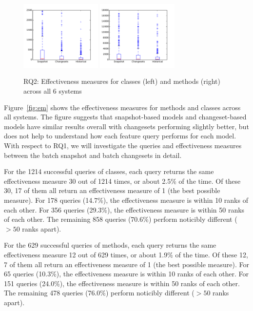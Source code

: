 \begin{figure}[t]
\centering
\includegraphics[width=0.36\textwidth]{figures/rq2-overall-class}
\includegraphics[width=0.36\textwidth]{figures/rq2-overall-method}
\caption{RQ2: Effectiveness measures for classes (left) and methods (right) across all 6 systems}
\label{fig:em6}
\end{figure}

Figure~\ref{fig:em} shows the effectiveness measures for methods and classes
across all systems. The figure suggests that snapshot-based models and
changeset-based models have similar results overall with changesets performing
slightly better, but does not help to understand how each feature query performs
for each model.  With respect to RQ1, we will investigate the queries and
effectiveness measures between the batch snapshot and batch changesets in
detail.

For the 1214 successful queries of classes,
each query returns the same effectiveness measure 30 out of 1214 times, or about 2.5\% of the time.
Of these 30, 17 of them all return an effectiveness measure of 1 (the best possible measure).
For 178 queries (14.7\%), the effectiveness measure is within 10 ranks of each other.
For 356 queries (29.3\%), the effectiveness measure is within 50 ranks of each other.
The remaining 858 queries (70.6\%) perform noticibly different ($> 50$ ranks apart).

For the 629 successful queries of methods,
each query returns the same effectiveness measure 12 out of 629 times, or about 1.9\% of the time.
Of these 12, 7 of them all return an effectiveness measure of 1 (the best possible measure).
For 65 queries (10.3\%), the effectiveness measure is within 10 ranks of each other.
For 151 queries (24.0\%), the effectiveness measure is within 50 ranks of each other.
The remaining 478 queries (76.0\%) perform noticibly different ($> 50$ ranks apart).

